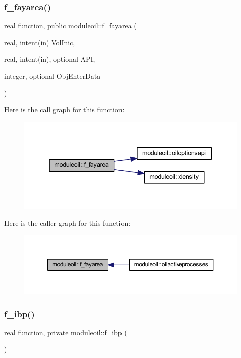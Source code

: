 \subsubsection{\texorpdfstring{f\+\_\+fayarea()}{f\_fayarea()}}
{\footnotesize\ttfamily real function, public moduleoil\+::f\+\_\+fayarea (\begin{DoxyParamCaption}\item[{real, intent(in)}]{Vol\+Inic,  }\item[{real, intent(in), optional}]{A\+PI,  }\item[{integer, optional}]{Obj\+Enter\+Data }\end{DoxyParamCaption})}

Here is the call graph for this function\+:\nopagebreak
\begin{figure}[H]
\begin{center}
\leavevmode
\includegraphics[width=337pt]{namespacemoduleoil_aae34355db8babcba835b1b3af18baa95_cgraph}
\end{center}
\end{figure}
Here is the caller graph for this function\+:\nopagebreak
\begin{figure}[H]
\begin{center}
\leavevmode
\includegraphics[width=350pt]{namespacemoduleoil_aae34355db8babcba835b1b3af18baa95_icgraph}
\end{center}
\end{figure}
\mbox{\label{namespacemoduleoil_ad53f4584cf329af849a4ee69c63351c9}} 
\subsubsection{\texorpdfstring{f\+\_\+ibp()}{f\_ibp()}}
{\footnotesize\ttfamily real function, private moduleoil\+::f\+\_\+ibp (\begin{DoxyParamCaption}{ }\end{DoxyParamCaption})\hspace{0.3cm}{\ttfamily [private]}}


